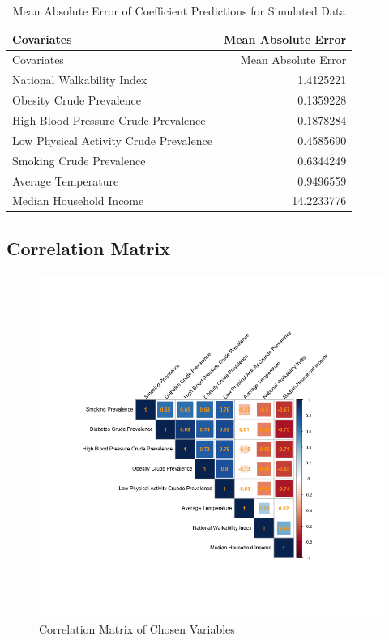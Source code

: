 \documentclass[
]{article}
\begin{document}
\begin{longtable}[]{@{}lr@{}}
\caption{Mean Absolute Error of Coefficient Predictions for Simulated
Data}\tabularnewline
\toprule\noalign{}
Covariates & Mean Absolute Error \\
\midrule\noalign{}
\endfirsthead
\toprule\noalign{}
Covariates & Mean Absolute Error \\
\midrule\noalign{}
\endhead
\bottomrule\noalign{}
\endlastfoot
National Walkability Index & 1.4125221 \\
Obesity Crude Prevalence & 0.1359228 \\
High Blood Pressure Crude Prevalence & 0.1878284 \\
Low Physical Activity Crude Prevalence & 0.4585690 \\
Smoking Crude Prevalence & 0.6344249 \\
Average Temperature & 0.9496559 \\
Median Household Income & 14.2233776 \\
\end{longtable}

\subsection{Correlation Matrix}\label{correlation-matrix-1}

\begin{figure}[H]

{\centering \includegraphics{correlation_plot.png}

}

\caption{Correlation Matrix of Chosen Variables}

\end{figure}%
\end{document}

